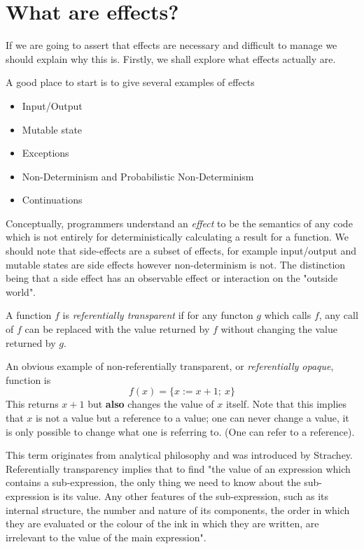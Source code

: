 \section{What are effects?}
If we are going to assert that effects are necessary
and difficult to manage we should explain why this is.
Firstly, we shall explore what effects actually are.\\

\begin{example}
    A good place to start is to give several examples of effects
    \begin{itemize}
        \item Input/Output
        \item Mutable state
        \item Exceptions
        \item Non-Determinism and Probabilistic Non-Determinism
        \item Continuations
    \end{itemize}
\end{example}

Conceptually, programmers understand an \textit{effect} to be the semantics of any code
which is not entirely for deterministically calculating a result for a function.
We should note that side-effects are a subset of effects,
for example input/output and mutable states are side effects
however non-determinism is not.
The distinction being that a side effect
has an observable effect or interaction on the "outside world".\\

\begin{definition}
    A function $f$ is \textit{referentially transparent} if
    for any functon $g$ which calls $f$,
    any call of $f$ can be replaced with the value returned by $f$
    without changing the value returned by $g$.

    An obvious example of non-referentially transparent,
    or \textit{referentially opaque}, function is
    \begin{equation}
        f(x) = \{x := x + 1;\ x\}
    \end{equation}
    This returns $x + 1$ but \textbf{also} changes the value of $x$ itself.
    Note that this implies that $x$ is not a value but a reference to a value;
    one can never change a value, it is only possible to change
    what one is referring to. (One can refer to a reference).

    This term originates from analytical philosophy
    and was introduced by Strachey.
    Referentially transparency implies that to find
    "the value of an expression which contains a sub-expression,
    the only thing we need to know about the sub-expression is its value.
    Any other features of the sub-expression,
    such as its internal structure,
    the number and nature of its components,
    the order in which they are evaluated or
    the colour of the ink in which they are written,
    are irrelevant to the value of the main expression"\cite{strachey2000fundamental}.\\
\end{definition}

